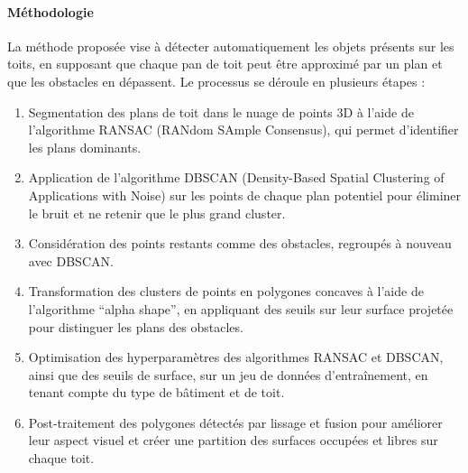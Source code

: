 \paragraph{Méthodologie}
\par{La méthode proposée vise à détecter automatiquement les objets présents sur les toits, en supposant que chaque pan de toit peut être approximé par un plan et que les obstacles en dépassent. Le processus se déroule en plusieurs étapes :}
\begin{enumerate}
    \item Segmentation des plans de toit dans le nuage de points 3D à l'aide de l'algorithme RANSAC (RANdom SAmple Consensus), qui permet d'identifier les plans dominants.
    \item Application de l'algorithme DBSCAN (Density-Based Spatial Clustering of Applications with Noise) sur les points de chaque plan potentiel pour éliminer le bruit et ne retenir que le plus grand cluster.
    \item Considération des points restants comme des obstacles, regroupés à nouveau avec DBSCAN.
    \item Transformation des clusters de points en polygones concaves à l'aide de l'algorithme ``alpha shape'', en appliquant des seuils sur leur surface projetée pour distinguer les plans des obstacles.
    \item Optimisation des hyperparamètres des algorithmes RANSAC et DBSCAN, ainsi que des seuils de surface, sur un jeu de données d'entraînement, en tenant compte du type de bâtiment et de toit.
    \item Post-traitement des polygones détectés par lissage et fusion pour améliorer leur aspect visuel et créer une partition des surfaces occupées et libres sur chaque toit.
\end{enumerate}

\newpage
